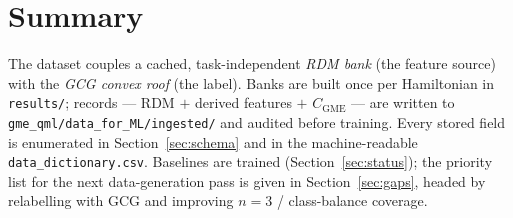 \documentclass[11pt]{article}
\newcommand{\code}[1]{\texttt{\small #1}}
\newcommand{\CGME}{\ensuremath{C_{\mathrm{GME}}}}
\begin{document}
\section{Summary}
The dataset couples a cached, task-independent \emph{RDM bank} (the feature
source) with the \emph{GCG convex roof} (the label). Banks are built once per
Hamiltonian in \code{results/}; records --- RDM $+$ derived features $+$ \CGME{}
--- are written to \code{gme\_qml/data\_for\_ML/ingested/} and audited before
training. Every stored field is enumerated in Section~\ref{sec:schema} and in
the machine-readable \code{data\_dictionary.csv}. Baselines are trained
(Section~\ref{sec:status}); the priority list for the next data-generation pass
is given in Section~\ref{sec:gaps}, headed by relabelling with GCG and
improving $n=3$ / class-balance coverage.
\end{document}

